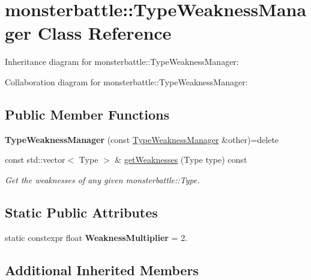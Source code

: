 \hypertarget{classmonsterbattle_1_1TypeWeaknessManager}{}\section{monsterbattle\+:\+:Type\+Weakness\+Manager Class Reference}
\label{classmonsterbattle_1_1TypeWeaknessManager}


Inheritance diagram for monsterbattle\+:\+:Type\+Weakness\+Manager\+:


Collaboration diagram for monsterbattle\+:\+:Type\+Weakness\+Manager\+:
\subsection*{Public Member Functions}
\begin{DoxyCompactItemize}
\item 
\mbox{\label{classmonsterbattle_1_1TypeWeaknessManager_a5391064391f6186af965673b504170a1}} 
{\bfseries Type\+Weakness\+Manager} (const \hyperlink{classmonsterbattle_1_1TypeWeaknessManager}{Type\+Weakness\+Manager} \&other)=delete
\item 
const std\+::vector$<$ Type $>$ \& \hyperlink{classmonsterbattle_1_1TypeWeaknessManager_a441bc5ce079cae18480cf1d435a5b6f9}{get\+Weaknesses} (Type type) const
\begin{DoxyCompactList}\small\item\em Get the weaknesses of any given monsterbattle\+::\+Type. \end{DoxyCompactList}\end{DoxyCompactItemize}
\subsection*{Static Public Attributes}
\begin{DoxyCompactItemize}
\item 
\mbox{\label{classmonsterbattle_1_1TypeWeaknessManager_a1803b5e661fcb83ba82af3255e29988e}} 
static constexpr float {\bfseries Weakness\+Multiplier} = 2.
\end{DoxyCompactItemize}
\subsection*{Additional Inherited Members}


